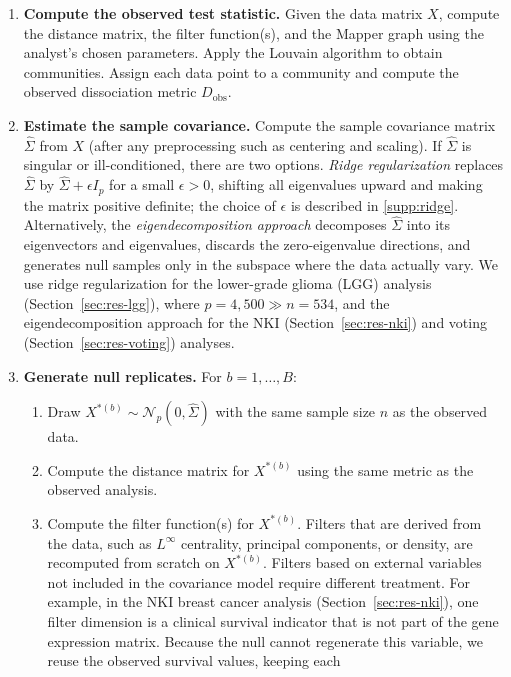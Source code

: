 \documentclass[hidelinks]{siamart251216}
\begin{document}
\begin{enumerate}
\item[1.] \textbf{Compute the observed test statistic.} Given the data
  matrix $X$, compute the distance matrix, the filter function(s), and
  the Mapper graph using the analyst's chosen parameters. Apply the
  Louvain algorithm to obtain communities. Assign each data point to a
  community and compute the observed dissociation metric $D_{\mathrm{obs}}$.
\item[2.] \textbf{Estimate the sample covariance.} Compute the sample
  covariance matrix $\hat{\Sigma}$ from $X$ (after any preprocessing
  such as centering and scaling). If $\hat{\Sigma}$ is singular or
  ill-conditioned, there are two options.  \emph{Ridge regularization}
  replaces $\hat{\Sigma}$ by $\hat{\Sigma} + \epsilon I_p$ for a small
  $\epsilon > 0$, shifting all eigenvalues upward and making the matrix
  positive definite; the choice of $\epsilon$ is described in
  \cref{supp:ridge}.  Alternatively, the
  \emph{eigendecomposition approach} decomposes $\hat{\Sigma}$ into its
  eigenvectors and eigenvalues, discards the zero-eigenvalue directions,
  and generates null samples only in the subspace where the data actually
  vary.  We use ridge regularization for the lower-grade glioma (LGG) analysis
  (Section~\ref{sec:res-lgg}), where $p = 4{,}500 \gg n = 534$, and the
  eigendecomposition approach for the NKI
  (Section~\ref{sec:res-nki}) and voting
  (Section~\ref{sec:res-voting}) analyses.
\item[3.] \textbf{Generate null replicates.} For $b = 1, \ldots, B$:
  \begin{enumerate}
  \item[(a)] Draw $X^{*(b)} \sim \mathcal{N}_p(0, \hat{\Sigma})$ with
    the same sample size $n$ as the observed data.
  \item[(b)] Compute the distance matrix for $X^{*(b)}$ using the same
    metric as the observed analysis.
  \item[(c)] Compute the filter function(s) for $X^{*(b)}$.  Filters
    that are derived from the data, such as $L^\infty$ centrality,
    principal components, or density, are recomputed from scratch on
    $X^{*(b)}$.  Filters based on external variables not included in
    the covariance model require different treatment.  For example, in
    the NKI breast cancer analysis (Section~\ref{sec:res-nki}), one
    filter dimension is a clinical survival indicator that is not part
    of the gene expression matrix.  Because the null cannot regenerate
    this variable, we reuse the observed survival values, keeping each

\end{enumerate}
\end{enumerate}
\end{document}
